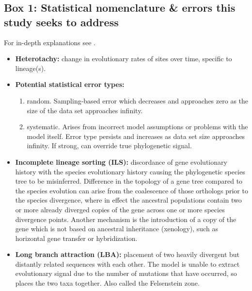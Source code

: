 \documentclass[fleqn,10pt,lineno]{wlpeerj} %
\begin{document}
\subsection*{Box 1: Statistical nomenclature \& errors this study seeks to address}
\label{sec:statbox}
For in-depth explanations see \citep{yang2014molecular}.
\begin{itemize}[noitemsep]
\item \textbf{Heterotachy:} change in evolutionary rates of sites over time, specific to lineage(s).
\item \textbf{Potential statistical error types:}
\begin{enumerate}[noitemsep]
\item random. Sampling-based error which decreases and approaches zero as the size of the data set approaches infinity.\\
\item systematic. Arises from incorrect model assumptions or problems with the model itself. 
Error type persists and increases as data set size approaches infinity. 
If strong, can override true phylogenetic signal.
\end{enumerate}
\item \textbf{Incomplete lineage sorting (ILS):} discordance of gene evolutionary history with the species evolutionary history causing the phylogenetic species tree to be misinferred. 
Difference in the topology of a gene tree compared to the species evolution can arise from the coalescence of those orthologs prior to the species divergence, where in effect the ancestral populations contain two or more already diverged copies of the gene across one or more species divergence points. 
Another mechanism is the introduction of a copy of the gene which is not based on ancestral inheritance (xenology), such as horizontal gene transfer or hybridization.
\item \textbf{Long branch attraction (LBA):} placement of two heavily divergent but distantly related sequences with each other. 
The model is unable to extract evolutionary signal due to the number of mutations that have occurred, so places the two taxa together. 
Also called the Felsenstein zone.
\end{itemize}
\end{document}
